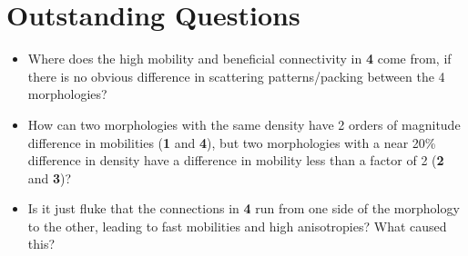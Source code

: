\documentclass[12pt]{article}
\begin{document}
\section{Outstanding Questions}


\begin{itemize}
    \item{Where does the high mobility and beneficial connectivity in \textbf{4} come from, if there is no obvious difference in scattering patterns/packing between the 4 morphologies?}
    \item{How can two morphologies with the same density have 2 orders of magnitude difference in mobilities (\textbf{1} and \textbf{4}), but two morphologies with a near 20\% difference in density have a difference in mobility less than a factor of 2 (\textbf{2} and \textbf{3})?}
    \item{Is it just fluke that the connections in \textbf{4} run from one side of the morphology to the other, leading to fast mobilities and high anisotropies? What caused this?}
\end{itemize}




\end{document}
